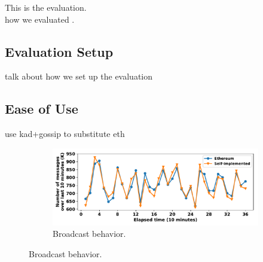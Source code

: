 This is the evaluation. \\

how we evaluated \xxx.

\subsection{Evaluation Setup}

talk about how we set up the evaluation

\subsection{Ease of Use}

use kad+gossip to substitute eth

\begin{figure}[ht]
  \centering
    \begin{subfigure}[b]{0.48\textwidth}
	  \includegraphics[width=\textwidth]{figures/eth_ourgossip_num_msg_on_time.pdf}
	  \caption{Broadcast behavior.}
	  \label{eth_ourgossip_num_msg_on_time}
    \end{subfigure}


\end{figure}
